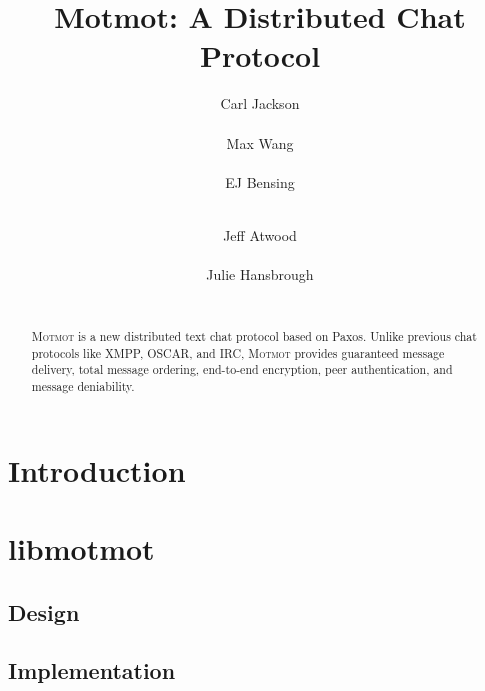 \documentclass{sig-alternate}
\newcommand\Motmot{\textsc{Motmot}\xspace}
\begin{document}

\title{Motmot: A Distributed Chat Protocol}

%
\author{
  \alignauthor
  Carl Jackson \\
     \\
  \alignauthor
  Max Wang \\
     \\
  \alignauthor
  EJ Bensing \\
     \\
  \and
  \alignauthor
  Jeff Atwood \\
     \\
  \alignauthor
  Julie Hansbrough \\
     \\
}

\maketitle

\begin{abstract}

\Motmot is a new distributed text chat protocol based on Paxos. Unlike previous
chat protocols like XMPP, OSCAR, and IRC, \Motmot provides guaranteed message
delivery, total message ordering, end-to-end encryption, peer authentication,
and message deniability.

\end{abstract}

\section{Introduction}

\section{libmotmot}

\subsection{Design}

\subsection{Implementation}
\end{document}
